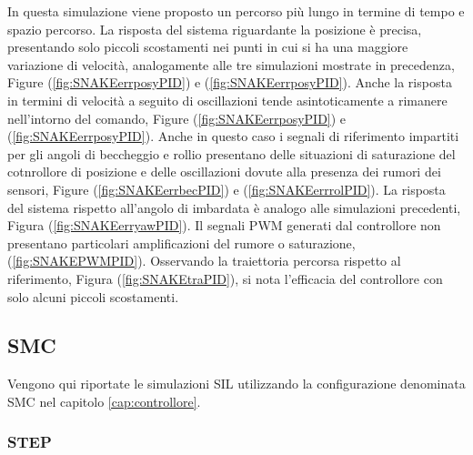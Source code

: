 In questa simulazione viene proposto un percorso più lungo in termine di tempo e spazio percorso. La risposta del sistema riguardante la posizione è precisa, presentando solo piccoli scostamenti nei punti in cui si ha una maggiore variazione di velocità, analogamente alle tre simulazioni mostrate in precedenza, Figure (\ref{fig:SNAKEerrposyPID}) e (\ref{fig:SNAKEerrposyPID}). Anche la risposta in termini di velocità a seguito di oscillazioni tende asintoticamente a rimanere nell'intorno del comando, Figure (\ref{fig:SNAKEerrposyPID}) e (\ref{fig:SNAKEerrposyPID}). Anche in questo caso i segnali di riferimento impartiti per gli angoli di beccheggio e rollio presentano delle situazioni di saturazione del cotnrollore di posizione e delle oscillazioni dovute alla presenza dei rumori dei sensori, Figure (\ref{fig:SNAKEerrbecPID}) e (\ref{fig:SNAKEerrrolPID}). La risposta del sistema rispetto all'angolo di imbardata è analogo alle simulazioni precedenti, Figura (\ref{fig:SNAKEerryawPID}). Il segnali PWM generati dal controllore non presentano particolari amplificazioni del rumore o saturazione, (\ref{fig:SNAKEPWMPID}). Osservando la traiettoria percorsa rispetto al riferimento, Figura (\ref{fig:SNAKEtraPID}), si nota l'efficacia del controllore con solo alcuni piccoli scostamenti.

\clearpage
\subsection{SMC}

Vengono qui riportate le simulazioni SIL utilizzando la configurazione denominata SMC nel capitolo \ref{cap:controllore}.

\subsubsection{STEP}


